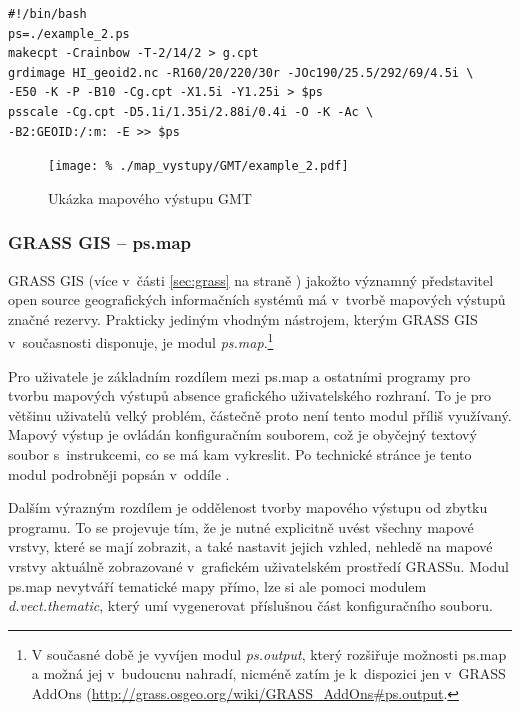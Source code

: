\documentclass[a4paper,12pt,draft]{article}
\newcommand{\modul}[1]{\emph{#1}}
\begin{document}
\begin{lstlisting}[style=script]
#!/bin/bash
ps=./example_2.ps
makecpt -Crainbow -T-2/14/2 > g.cpt
grdimage HI_geoid2.nc -R160/20/220/30r -JOc190/25.5/292/69/4.5i \
-E50 -K -P -B10 -Cg.cpt -X1.5i -Y1.25i > $ps
psscale -Cg.cpt -D5.1i/1.35i/2.88i/0.4i -O -K -Ac \
-B2:GEOID:/:m: -E >> $ps
\end{lstlisting}


\begin{figure}[h!]
\centering
\texttt{[image: \%
./map\_vystupy/GMT/example\_2.pdf]}
  \caption{Ukázka mapového výstupu GMT}
  \label{fig:gmt}
\end{figure}



\subsubsection{GRASS GIS -- ps.map}
\label{sec:porovnani:psmap}
GRASS GIS (více v~části \ref{sec:grass} na straně \pageref{sec:grass})
jakožto významný představitel open source geografických informačních
systémů má v~tvorbě mapových výstupů značné rezervy. Prakticky
jediným vhodným nástrojem, kterým GRASS GIS v~současnosti disponuje,
je modul \modul{ps.map}.\footnote{V současné době je vyvíjen modul
\modul{ps.output}, který rozšiřuje možnosti ps.map a možná
jej v~budoucnu nahradí, nicméně zatím je k~dispozici jen v~GRASS AddOns
(\url{http://grass.osgeo.org/wiki/GRASS_AddOns\#ps.output}.}

Pro uživatele je základním rozdílem mezi ps.map a ostatními
programy pro tvorbu mapových výstupů  absence grafického uživatelského
rozhraní. To je pro většinu uživatelů velký problém, částečně
proto není tento modul příliš využívaný. Mapový výstup je ovládán
konfiguračním souborem, což je obyčejný textový soubor s~instrukcemi,
co se má kam vykreslit. Po technické stránce je tento modul podrobněji
popsán v~oddíle \nameref{sec:psmap}.

Dalším výrazným rozdílem je oddělenost tvorby mapového výstupu od
zbytku programu. To se projevuje tím, že je nutné explicitně uvést
všechny mapové vrstvy, které se mají zobrazit, a také nastavit jejich
vzhled, nehledě na mapové vrstvy aktuálně zobrazované  v~grafickém
uživatelském prostředí GRASSu. Modul ps.map nevytváří
tematické mapy přímo, lze si ale pomoci modulem \emph{d.vect.thematic},
který umí vygenerovat příslušnou část konfiguračního souboru.
\fi
\end{document}
